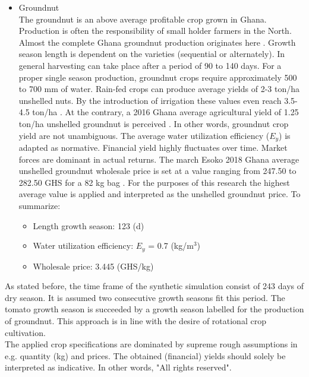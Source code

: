 \begin{itemize}
\item{Groundnut} \\
The groundnut is an above average profitable crop grown in Ghana. Production is often the responsibility of small holder farmers in the North. Almost the complete Ghana groundnut production originates here \citep{Ghana-made2018}. Growth season length is dependent on the varieties (sequential or alternately). In general harvesting can take place after a period of 90 to 140 days. For a proper single season production, groundnut crops require approximately 500 to 700 mm of water. Rain-fed crops can produce average yields of 2-3 ton/ha unshelled nuts. By the introduction of irrigation these values even reach 3.5-4.5 ton/ha \citep{FoodandAgriculturalOrganisationoftheUnitedNationsFAO2018a}.  At the contrary, a 2016 Ghana average agricultural yield of 1.25 ton/ha unshelled groundnut is perceived \citep{FoodandAgriculturalOrganisationoftheUnitedNationsFAO2018}. 
In other words, groundnut crop yield are not unambiguous. The \citet{FoodandAgriculturalOrganisationoftheUnitedNationsFAO2018a} average water utilization efficiency ($E_y$) is adapted as normative. Financial yield highly fluctuates over time. Market forces are dominant in actual returns. The march Esoko 2018 Ghana average unshelled groundnut wholesale price is set at a value ranging from 247.50 to 282.50 GHS for a 82 kg bag \citep{ModernGhana2018}. For the purposes of this research the highest average value is applied and interpreted as the unshelled groundnut price. To summarize:
\begin{itemize}
\item{Length growth season: 123 (d)}
\item{Water utilization efficiency: $E_y$ = 0.7 (kg/m$^3$)}
\item{Wholesale price: 3.445 (GHS/kg)}
\end{itemize} 
\end{itemize}

As stated before, the time frame of the synthetic simulation consist of 243 days of dry season. It is assumed two consecutive growth seasons fit this period. The tomato growth season is succeeded by a growth season labelled for the production of groundnut. This approach is in line with the desire of rotational crop cultivation. \\

The applied crop specifications are dominated by supreme rough assumptions in e.g. quantity (kg) and prices. The obtained (financial) yields should solely be interpreted as indicative. In other words, "All rights reserved". \\
 
